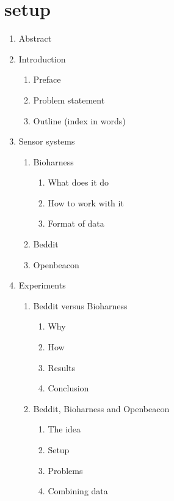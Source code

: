 \section{setup}
	\begin{enumerate}
		\item Abstract
		\item Introduction
		\begin{enumerate}
			\item Preface
			\item Problem statement
			\item Outline (index in words)
		\end{enumerate}
		\item {Sensor systems}
		\begin{enumerate}
			\item Bioharness
				\begin{enumerate}

					\item What does it do
					\item How to work with it
					\item Format of data
				\end{enumerate}
			\item Beddit
			\item Openbeacon
		\end{enumerate}
		\item Experiments
		\begin{enumerate}
			\item Beddit versus Bioharness
			\begin{enumerate}
				\item Why
				\item How
				\item Results
				\item Conclusion
			\end{enumerate}
			\item Beddit, Bioharness and Openbeacon
			\begin{enumerate}
				\item The idea
				\item Setup
				\item Problems
				\item Combining data
			\end{enumerate}
		\end{enumerate}
	\end{enumerate}
